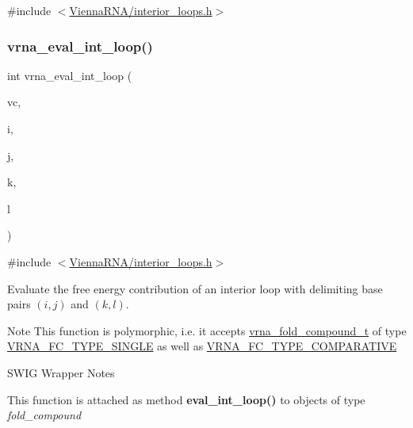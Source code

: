 {\ttfamily \#include $<$\mbox{\hyperlink{interior__loops_8h}{Vienna\+R\+N\+A/interior\+\_\+loops.\+h}}$>$}

\mbox{\label{group__loops_ga018f1314dbbae42fdd27c94670b61721}} 
\subsubsection{\texorpdfstring{vrna\+\_\+eval\+\_\+int\+\_\+loop()}{vrna\_eval\_int\_loop()}}
{\footnotesize\ttfamily int vrna\+\_\+eval\+\_\+int\+\_\+loop (\begin{DoxyParamCaption}\item[{\mbox{\hyperlink{group__fold__compound_ga1b0cef17fd40466cef5968eaeeff6166}{vrna\+\_\+fold\+\_\+compound\+\_\+t}} $\ast$}]{vc,  }\item[{int}]{i,  }\item[{int}]{j,  }\item[{int}]{k,  }\item[{int}]{l }\end{DoxyParamCaption})}



{\ttfamily \#include $<$\mbox{\hyperlink{interior__loops_8h}{Vienna\+R\+N\+A/interior\+\_\+loops.\+h}}$>$}



Evaluate the free energy contribution of an interior loop with delimiting base pairs $(i,j)$ and $(k,l)$. 

\begin{DoxyNote}{Note}
This function is polymorphic, i.\+e. it accepts \mbox{\hyperlink{group__fold__compound_ga1b0cef17fd40466cef5968eaeeff6166}{vrna\+\_\+fold\+\_\+compound\+\_\+t}} of type \mbox{\hyperlink{group__fold__compound_gga01a4ff86fa71deaaa5d1abbd95a1447da7e264dd3cf2dc9b6448caabcb7763cd6}{V\+R\+N\+A\+\_\+\+F\+C\+\_\+\+T\+Y\+P\+E\+\_\+\+S\+I\+N\+G\+LE}} as well as \mbox{\hyperlink{group__fold__compound_gga01a4ff86fa71deaaa5d1abbd95a1447dab821ce46ea3cf665be97df22a76f5023}{V\+R\+N\+A\+\_\+\+F\+C\+\_\+\+T\+Y\+P\+E\+\_\+\+C\+O\+M\+P\+A\+R\+A\+T\+I\+VE}}
\end{DoxyNote}
\begin{DoxyRefDesc}{S\+W\+I\+G Wrapper Notes}
\item[\mbox{\hyperlink{wrappers__wrappers000034}{S\+W\+I\+G Wrapper Notes}}]This function is attached as method {\bfseries eval\+\_\+int\+\_\+loop()} to objects of type {\itshape fold\+\_\+compound} \end{DoxyRefDesc}
\mbox{\label{group__loops_ga516749f1374dccb079ea75c9711c31e6}} 
